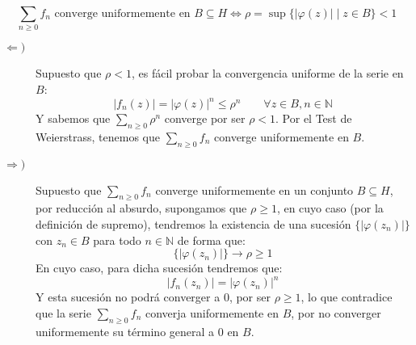 \documentclass[12pt]{article}
\begin{document}
\begin{ejercicio}[3.5 puntos]
        \begin{equation*}
            \sum_{n\geq 0} f_n \text{\ converge uniformemente en\ } B \subseteq H \Longleftrightarrow \rho = \sup\{|\varphi(z)| \mid z\in B\} < 1
        \end{equation*}
        \begin{description}
            \item [$\Longleftarrow)$] Supuesto que $\rho < 1$, es fácil probar la convergencia uniforme de la serie en $B$:
                \begin{equation*}
                    |f_n(z)| = {|\varphi(z)|}^{n} \leq \rho^n \qquad \forall z\in B, n\in \mathbb{N}
                \end{equation*}
                Y sabemos que $\sum\limits_{n\geq 0}\rho^n$ converge por ser $\rho < 1$. Por el Test de Weierstrass, tenemos que $\sum\limits_{n\geq 0}f_n$ converge uniformemente en $B$.
            \item [$\Longrightarrow)$] Supuesto que $\sum\limits_{n\geq 0}f_n$ converge uniformemente en un conjunto $B\subseteq H$, por reducción al absurdo, supongamos que $\rho \geq 1$, en cuyo caso (por la definición de supremo), tendremos la existencia de una sucesión $\{|\varphi(z_n)|\}$ con $z_n \in B$ para todo $n\in \mathbb{N}$ de forma que:
                \begin{equation*}
                    \{|\varphi(z_n)|\} \to \rho \geq 1
                \end{equation*}
                En cuyo caso, para dicha sucesión tendremos que:
                \begin{equation*}
                    |f_n(z_n)| = {|\varphi(z_n)|}^{n}
                \end{equation*}
                Y esta sucesión no podrá converger a 0, por ser $\rho \geq 1$, lo que contradice que la serie $\sum\limits_{n\geq 0} f_n$ converja uniformemente en $B$, por no converger uniformemente su término general a 0 en $B$.
        \end{description}
    \end{ejercicio}
\end{document}
